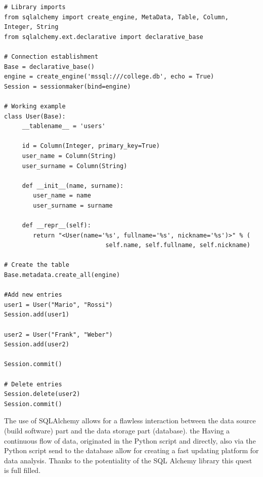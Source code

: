 \documentclass[../main.tex]{subfiles}
\begin{document}
\lstset{language=Python}
\lstset{frame=lines}
\lstset{basicstyle=\footnotesize}
\begin{lstlisting}
# Library imports
from sqlalchemy import create_engine, MetaData, Table, Column, 
Integer, String
from sqlalchemy.ext.declarative import declarative_base

# Connection establishment
Base = declarative_base()
engine = create_engine('mssql:///college.db', echo = True)
Session = sessionmaker(bind=engine)

# Working example
class User(Base):
     __tablename__ = 'users'

     id = Column(Integer, primary_key=True)
     user_name = Column(String)
     user_surname = Column(String)

     def __init__(name, surname):
        user_name = name
        user_surname = surname
        
     def __repr__(self):
        return "<User(name='%s', fullname='%s', nickname='%s')>" % (
                            self.name, self.fullname, self.nickname)
            
# Create the table
Base.metadata.create_all(engine)

#Add new entries
user1 = User("Mario", "Rossi")
Session.add(user1)

user2 = User("Frank", "Weber")
Session.add(user2)

Session.commit()

# Delete entries
Session.delete(user2)
Session.commit()
\end{lstlisting}
The use of SQLAlchemy allows for a flawless interaction between the data source (build software) part and the data storage part (database). the  Having a continuous flow of data, originated in the Python script and directly, also via the Python script send to the database allow for creating a fast updating platform for data analysis. Thanks to the potentiality of the SQL Alchemy library this quest is full filled. 
\cleardoublepage
\end{document}
